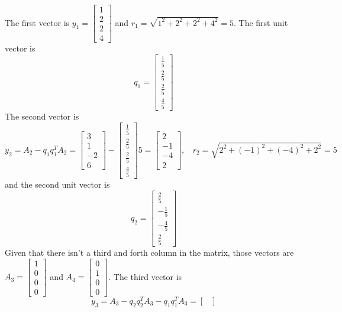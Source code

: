 \documentclass[10pt,letterpaper]{article}
\begin{document}
\begin{enumerate}[label=\textbf{(\alph{enumi})}, wide=0pt]
\color{TangGreen}
The first vector is $y_{1} = \begin{bmatrix}
1 \\
2 \\
2 \\
4 
\end{bmatrix}$ and $r_{1} = \sqrt{1^{2} + 2^{2} + 2^{2} + 4^{2}} = 5$. The first unit vector is
$$q_{1} = \begin{bmatrix}
\frac{1}{5} \\
\frac{2}{5} \\
\frac{2}{5} \\
\frac{4}{5} 
\end{bmatrix}$$
The second vector is
$$y_{2} = A_{2} - q_{1}q_{1}^{T}A_{2} = \begin{bmatrix}
3 \\
1 \\
-2 \\
6 
\end{bmatrix} - \begin{bmatrix}
\frac{1}{5} \\
\frac{2}{5} \\
\frac{2}{5} \\
\frac{4}{5} 
\end{bmatrix}5 = \begin{bmatrix}
2 \\
-1 \\
-4 \\
2 
\end{bmatrix},\ \ \ \ r_{2} = \sqrt{2^{2} + (-1)^{2} + (-4)^{2} + 2^{2}} = 5$$
and the second unit vector is
$$q_{2} = \begin{bmatrix}
\frac{2}{5} \\
-\frac{1}{5} \\
-\frac{4}{5} \\
\frac{2}{5} 
\end{bmatrix}$$
Given that there isn't a third and forth column in the matrix, those vectors are $A_{3} = \begin{bmatrix}
1 \\
0 \\
0 \\
0 
\end{bmatrix}$ and $A_{4} = \begin{bmatrix}
0 \\
1 \\
0 \\
0 
\end{bmatrix}$. The third vector is
$$y_{3} = A_{3} - q_{2}q_{2}^{T}A_{3} - q_{1}q_{1}^{T}A_{3} = \begin{bmatrix}

\end{bmatrix}$$
\end{enumerate}
\end{document}
